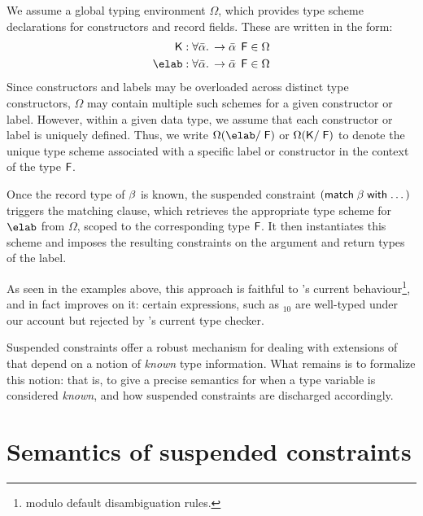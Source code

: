 \documentclass[acmsmall,screen,nonacm]{acmart}
\begin{document}
We assume a global typing environment $\Omega$, which provides type scheme
declarations for
constructors and record fields. These are written in the form:
\begin{align*}
  \K : \tfor \tvs \t \to \tvs \Fapp &\in \Omega \\
  \elab : \tfor \tvs \t \to \tvs \Fapp &\in \Omega
\end{align*}
Since constructors and labels may be overloaded across distinct type
constructors, $\Omega$ may contain multiple such schemes for a given
constructor or label.  However, within a given data type, we assume that
each constructor or label is uniquely defined. Thus, we write $\Omega(\elab
/ \F)$ or $\Omega(\mathsf{K} / \mathrel{\mathsf{F}}\mathclose{})$ to denote the unique type scheme associated with
a specific label or constructor in the context of the type $\mathrel{\mathsf{F}}\mathclose{}$.

Once the record type of $\beta$ is known, the suspended constraint
$(\mathopen{}\mathrel{\mathsf{match}} \beta \mathrel{\mathsf{with}} \dots)$ triggers the matching clause, which retrieves the
appropriate type scheme for $\elab$ from $\Omega$, scoped to the
corresponding type $\mathrel{\mathsf{F}}\mathclose{}$. It then instantiates this scheme and imposes the
resulting constraints on the argument and return types of the label.



As seen in the examples above, this approach is faithful to \OCaml's current
behaviour\footnote {modulo default disambiguation rules.}, and in fact
improves on it: certain expressions, such as $_{10}$ are well-typed
under our account but rejected by \OCaml's current type checker.


Suspended constraints offer a robust mechanism for dealing with extensions of
\ML that depend on a notion of \emph{known} type information. What remains
is to formalize this notion: that is, to give a precise semantics for when
a type variable is considered \emph{known}, and how suspended constraints
are discharged accordingly.


\section{Semantics of suspended constraints}
\label{sec:semantics}
\end{document}
